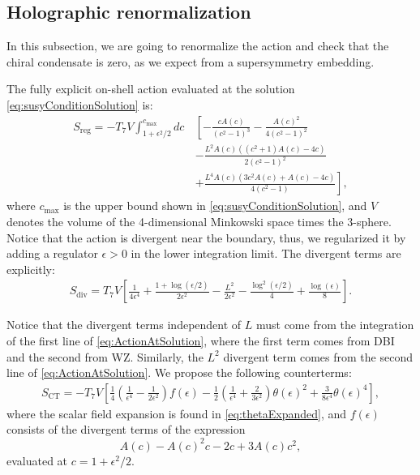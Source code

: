 \subsection{Holographic renormalization}
In this subsection, we are going to renormalize the action and check that the chiral condensate is zero, as we expect from a supersymmetry embedding.

The fully explicit on-shell action evaluated at the solution \eqref{eq:susyConditionSolution} is:
\begin{align}\label{eq:ActionAtSolution}
 S_\text{reg} = -T_7 V \int_{1 + \epsilon^2/2}^{c_\text{max}} d c \, 
 &\left[-\frac{c A(c)}{\left(c^2-1\right)^3} -\frac{A(c)^2}{4 \left(c^2-1\right)^2} \right. \nonumber\\
 &-\frac{L^2 A(c) \left(\left(c^2+1\right) A(c)-4 c\right)}{2 \left(c^2-1\right)^2} \nonumber\\
 &+\left.\frac{L^4 A(c) \left(3 c^2 A(c)+A(c)-4 c\right)}{4 \left(c^2-1\right)}\right],
\end{align}
where $c_\text{max}$ is the upper bound shown in \eqref{eq:susyConditionSolution}, and $V$ denotes the volume of the 4-dimensional Minkowski space times the 3-sphere. Notice that the action is divergent near the boundary, thus, we regularized it by adding a regulator $\epsilon>0$ in the lower integration limit. The divergent terms are explicitly:
\begin{align} \label{eq:Sdiv}
 S_\text{div} = T_7 V 
        \left[ \frac{1}{4 \epsilon ^4} +\frac{1+\log \left(\epsilon/2\right)}{2 \epsilon ^2}-\frac{L^2}{2 \epsilon ^2}-\frac{ \log ^2\left(\epsilon/2\right)}{4}+\frac{\log (\epsilon )}{8} \right].
\end{align}

Notice that the divergent terms independent of $L$ must come from the integration of the first line of \eqref{eq:ActionAtSolution}, where the first term comes from DBI and the second from WZ. Similarly, the $L^2$ divergent term comes from the second line of \eqref{eq:ActionAtSolution}. 
We propose the following counterterms:
\begin{align}\label{eq:counterterms}
 S_\text{CT} =  -T_7 V \left[ 
  \frac{1}{4} \left(\frac{1}{\epsilon ^4}-\frac{1}{2 \epsilon ^2}\right) f(\epsilon)
   -\frac{1}{2}\left(\frac{1}{\epsilon ^4}+\frac{2}{3 \epsilon ^2}\right) \theta (\epsilon)^2 + \frac{3}{8 \epsilon^4} \theta (\epsilon)^4
   \right],
\end{align}
where the scalar field expansion is found in \eqref{eq:thetaExpanded}, and
$f(\epsilon)$ consists of the divergent terms of the expression 
\begin{equation}
A(c)-A(c)^2 c - 2 c + 3 A(c) c^2,
\end{equation}
evaluated at $c=1+\epsilon^2/2$. 


